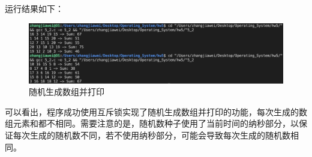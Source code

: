 \documentclass[UTF8]{report}
\begin{document}
运行结果如下：

\begin{figure}[H]
  \centering
  \includegraphics[width=\textwidth]{5_2.png}
  \caption{随机生成数组并打印}
\end{figure}

可以看出，程序成功使用互斥锁实现了随机生成数组并打印的功能，每次生成的数组元素和都不相同。需要注意的是，随机数种子使用了当前时间的纳秒部分，以保证每次生成的随机数不同，若不使用纳秒部分，可能会导致每次生成的随机数相同。
\end{document}
